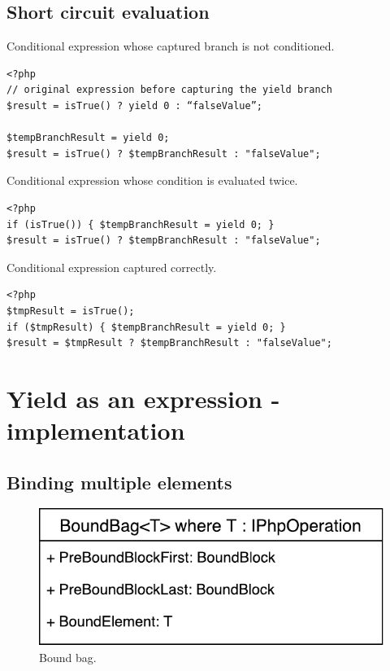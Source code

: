 \subsection{Short circuit evaluation}

\begin{listing}[H]
\caption{Conditional expression whose captured branch is not conditioned.}
\label{list5.3:CondNotGuarded}
\begin{verbatim}
<?php
// original expression before capturing the yield branch
$result = isTrue() ? yield 0 : “falseValue”;

$tempBranchResult = yield 0;
$result = isTrue() ? $tempBranchResult : "falseValue";
\end{verbatim}
\end{listing}

\begin{listing}[H]
\caption{Conditional expression whose condition is evaluated twice.}
\label{list5.3:CondTwice}
\begin{verbatim}
<?php
if (isTrue()) { $tempBranchResult = yield 0; }
$result = isTrue() ? $tempBranchResult : "falseValue";
\end{verbatim}
\end{listing}

\begin{listing}[H]
\caption{Conditional expression captured correctly.}
\label{list5.3:CondCorrect}
\begin{verbatim}
<?php
$tmpResult = isTrue();
if ($tmpResult) { $tempBranchResult = yield 0; }
$result = $tmpResult ? $tempBranchResult : "falseValue";
\end{verbatim}
\end{listing}

\section{Yield as an expression - implementation}

\subsection{Binding multiple elements}

\begin{figure}[h]
	\centering	
	\includegraphics[scale=0.75]{../img/5_3_BoundBag}	
	\caption{Bound bag.}
	\label{fig5.3:BoundBag}
\end{figure}

